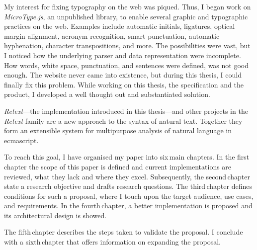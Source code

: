 My interest for fixing typography on the web was piqued.
Thus, I began work on \emph{MicroType.js}, an unpublished library, to
  enable several graphic and typographic practices on the web.
Examples include automatic initials, ligatures, optical margin alignment,
  acronym recognition, smart punctuation, automatic hyphenation, character
  transpositions, and more.
The possibilities were vast, but I noticed how the underlying parser and data
  representation were incomplete.
How words, white space, punctuation, and sentences were defined, was not
  good enough.
The website never came into existence, but during this thesis, I could
  finally fix this problem.
While working on this thesis, the specification and the product, I developed
  a well thought out and substantiated solution.

\emph{Retext}---the implementation introduced in this thesis---and other
  projects in the \emph{Retext} family are a new approach to the syntax of
  natural text.
Together they form an extensible system for multipurpose analysis of natural
  language in \gls{ecmascript}.

To reach this goal, I have organised my paper into six\,main chapters.
In the first\,chapter the scope of this paper is defined and current
  implementations are reviewed, what they lack and where they excel.
Subsequently, the second\,chapter state a research objective and drafts
  research questions.
The third\,chapter defines conditions for such a proposal, where I touch
  upon the target audience, use cases, and requirements.
In the fourth\,chapter, a better implementation is proposed and its
  architectural design is showed.

The fifth\,chapter describes the steps taken to validate the proposal.
I conclude with a sixth\,chapter that offers information on expanding the
  proposal.

\endgroup
